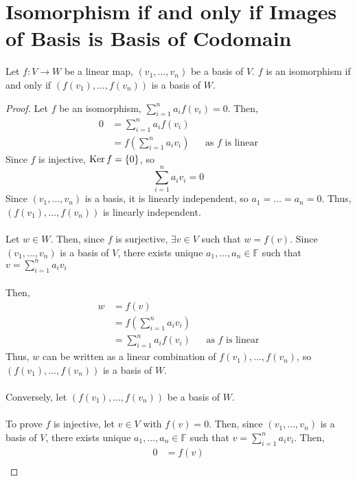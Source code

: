 \documentclass[letterpaper,12pt]{article}
\begin{document}
\section*{Isomorphism if and only if Images of Basis is Basis of Codomain}
\begin{theorem}
Let $f: V \rightarrow W$ be a linear map, $(v_1, \dots, v_n)$ be a basis of $V$. $f$ is an isomorphism if and only if $(f(v_1), \dots, f(v_n))$ is a basis of $W$.
\end{theorem}
\begin{proof}
Let $f$ be an isomorphism, $\sum_{i=1}^n a_i f(v_i) = 0$. Then,
\begin{align*}
    0 & = \sum_{i=1}^n a_i f(v_i) \\
    & = f\left(\sum_{i=1}^n a_i v_i \right) && \text{as $f$ is linear}
\end{align*}
Since $f$ is injective, $\operatorname{Ker}{f} = \left\{ 0 \right\}$, so
\begin{equation*}
    \sum_{i=1}^n a_i v_i = 0
\end{equation*}
Since $(v_1, \dots, v_n)$ is a basis, it is linearly independent, so $a_1 = \dots = a_n = 0$. Thus, $(f(v_1), \dots, f(v_n))$ is linearly independent.
\\ \\ Let $w \in W$. Then, since $f$ is surjective, $\exists v \in V$ such that $w = f(v)$. Since $(v_1, \dots, v_n)$ is a basis of $V$, there exists unique $a_1, \dots, a_n \in \mathbb{F}$ such that $v = \sum_{i=1}^n a_i v_i$
\\ \\ Then,
\begin{align*}
    w & = f(v) \\
    & = f\left(\sum_{i=1}^n a_i v_i \right) \\
    & = \sum_{i=1}^n a_i f(v_i) && \text{as $f$ is linear}
\end{align*}
Thus, $w$ can be written as a linear combination of $f(v_1), \dots, f(v_n)$, so $(f(v_1), \dots, f(v_n))$ is a basis of $W$.
\\ \\ Conversely, let $(f(v_1), \dots, f(v_n))$ be a basis of $W$.
\\ \\ To prove $f$ is injective, let $v \in V$ with $f(v) = 0$. Then, since $(v_1, \dots, v_n)$ is a basis of $V$, there exists unique $a_1, \dots, a_n \in \mathbb{F}$ such that $v = \sum_{i=1}^n a_i v_i$. Then,
\begin{align*}
    0 & = f(v) \\

\end{align*}
\end{proof}
\end{document}
